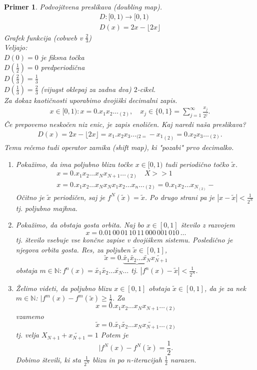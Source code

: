 \documentclass{article}
\newtheorem{primer}{Primer}
\newcommand{\N}{\mathbb{N}}
\begin{document}
\begin{primer}
Podvojitvena preslikava (doubling map).
\begin{align}
D:[0, 1) \rightarrow [0, 1) \\ 
D(x) = 2x - \lfloor{2x}\rfloor
\end{align}
Grafek funkcija (cobweb v $\frac{2}{3}$)\\ 
Veljajo: \\ 
$D(0) = 0$ je fiksna točka \\ 
$D(\frac{1}{2}) = 0$ predperiodična \\ 
$D(\frac{2}{3}) = \frac{1}{3}$ \\ 
$D(\frac{1}{3}) = \frac{2}{3}$
(vijugst oklepaj za zadna dva) $2$-cikel. \\ 
Za dokaz kaotičnosti uporabimo dvojiški decimalni zapis.
\begin{align*}
x\in [0, 1): x = 0.x_1 x_2 \dots_{(2)}, \quad x_j\in \{0, 1\} = \sum_{j=1}^\infty \frac{x_j}{2^j}.
\end{align*}
Če prepovemo neskočen niz enic, je zapis enoličen. Kaj naredi naša preslikava?
\begin{align*}
D(x) = 2x - \lfloor 2x \rfloor = x_1.x_2 x_3 \dots_{(2=} - {x_1}_{(2)} = 0.x_2 x_3 \dots_{(2)}.
\end{align*}
Temu rečemo tudi operator zamika (shift map), ki "pozabi" prvo decimalko. 
\begin{enumerate}
\item[(c1)] Pokažimo, da ima poljubno blizu točke $x\in [0, 1)$ tudi periodično točko $\tilde{x}$.
\begin{align*}
x = 0.x_1 x_2 \dots x_N x_{N+1} \dots_{(2)} \quad X >> 1 \\ 
x = 0.x_1 x_2 \dots x_N x_{N} x_1 x_2 \dots x_n\dots_{(2)} = 0. x_1 x_2 \dots x_{N_{(2)}}-
\end{align*}
Očitno je $\tilde{x}$ periodičen, saj je $f^N(\tilde{x}) = \tilde{x}$. Po drugo strani pa je $|x - \tilde{x}| < \frac{1}{2^N}$ tj. poljubno majhna.
\item[ii)] Pokažimo, da obstaja gosta orbita. Naj bo $x\in [0, 1]$ število z razvojem
$$
x = 0.01\, 00\, 01\, 10\, 11\, 000\, 001\, 010\, \dots
$$
tj. število vsebuje vse končne zapise v dvojiškem sistemu. Posledično je njegova orbita gosta. Res, za poljuben $\tilde{x} \in [0, 1]$, 
$$
\tilde{x} = 0. \underbrace{\tilde{x_1} \tilde{x_2}\dots \tilde{x_N}} \tilde{x_{N+1}}
$$
obstaja $m\in \N: f^n(x) = \tilde{x_1} \tilde{x_2}\dots \tilde{x_N} \dots$ tj. $|f^n(x) - \tilde{x}| < \frac{1}{2^N}$.
\item[iii)] Želimo videti, da poljubno blizu $x\in [0, 1]$ obstaja $\tilde{x} \in [0, 1]$, da je za nek $m\in \N$: $|f^m(x) - f^m(\tilde{x}) \geq \frac{1}{2}$. Za
$$
x = 0.x_1 x_2 \dots x_N x_{N+1} \dots_{(2)}
$$
vzamemo 
$$
\tilde{x} = 0.\tilde{x_1} \tilde{x_2}\dots {x_N} \tilde{x_{N+1}} \dots_{(2)}
$$
tj. velja $X_{N+1} + \tilde{x_{N+1}} = 1$
Potem je 
$$
|f^N(x) - f^N(\tilde{x}) = \frac{1}{2}.
$$
Dobimo števili, ki sta $\frac{1}{2^N}$ blizu in po $n$-iteracijah $\frac{1}{2}$ narazen.
\end{enumerate}
\end{primer}
\end{document}
